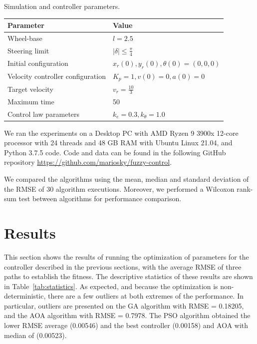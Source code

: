 \documentclass[symmetry,article,submit,moreauthors,pdftex]{Definitions/mdpi}
\begin{document}
\begin{specialtable}[H] 
\small
\caption{Simulation and controller parameters.}\label{tab:sim_params}
\begin{tabular}{ll}
\toprule
\textbf{Parameter}	& \textbf{Value}\\
\midrule
Wheel-base & $l=2.5$		\\
Steering limit & $|\delta|\le \frac{\pi}{4}$	\\
Initial configuration & $x_r(0),y_r(0),\theta(0)= (0,0,0)$\\
Velocity controller configuration & $K_p=1, v(0)=0, a(0)=0$\\
Target velocity & $v_r=\frac{10}{3}$\\
Maximum time & 50 \\ 
Control law parameters&$k_e=0.3, k_{\theta}=1.0$\\ 
\bottomrule
\end{tabular}
\end{specialtable}

We ran the experiments on a Desktop PC with AMD Ryzen 9 3900x 12-core processor
with 24 threads and 48 GB RAM with Ubuntu Linux 21.04, and Python 3.7.5 code.
Code and data can be found in the following GitHub repository
\url{https://github.com/mariosky/fuzzy-control}.

We compared the algorithms using the mean, median and standard deviation of the RMSE 
of 30 algorithm executions. Moreover, we performed a Wilcoxon rank-sum test between algorithms 
for performance comparison. 



\section{Results}\label{Results}

This section shows the results of running the optimization of parameters for
the controller described in the previous sections, with the average RMSE of
three paths to establish the fitness. The descriptive statistics of these
results are shown in Table~\ref{tab:statistics}.  As expected, and because the
optimization is non-deterministic, there are a few outliers at both extremes of
the performance. In particular, outliers are presented on the GA algorithm with
RMSE = 0.18205, and the AOA algorithm with RMSE = 0.7978. The PSO algorithm
obtained the lower RMSE average (0.00546) and the best controller (0.00158) and
AOA with median of (0.00523). 
\end{document}
